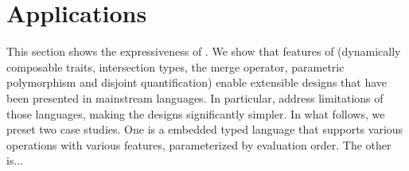 \section{Applications}


This section shows the expressiveness of \name. We show that features of \name
(dynamically composable traits, intersection types, the merge operator,
parametric polymorphism and disjoint quantification) enable extensible designs
that have been presented in mainstream languages. In particular, \name address
limitations of those languages, making the designs significantly simpler. In
what follows, we preset two case studies. One is a embedded typed language that
supports various operations with various features, parameterized by evaluation
order. The other is...


